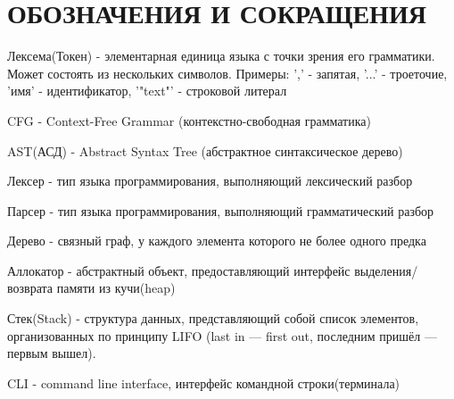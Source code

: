 
\chapter*{ОБОЗНАЧЕНИЯ И СОКРАЩЕНИЯ}             %

\newcommand{\acrstyle}[1]{#1}


\acrstyle{Лексема(Токен)} - элементарная единица языка с точки зрения его грамматики. Может состоять из нескольких символов.
Примеры: ',' - запятая, '...' - троеточие, 'имя' - идентификатор, '"text"' - строковой литерал

\acrstyle{CFG} - Context-Free Grammar (контекстно-свободная грамматика)

\acrstyle{AST(АСД)} - Abstract Syntax Tree (абстрактное синтаксическое дерево)

\acrstyle{Лексер} - тип языка программирования, выполняющий лексический разбор

\acrstyle{Парсер} - тип языка программирования, выполняющий грамматический разбор


\acrstyle{Дерево} - связный граф, у каждого элемента которого не более одного предка

\acrstyle{Аллокатор} - абстрактный объект, предоставляющий интерфейс выделения/возврата памяти из кучи(heap)

\acrstyle{Стек(Stack)} -  структура данных, представляющий собой список элементов, организованных по принципу LIFO (last in — first out, последним пришёл — первым вышел).

\acrstyle{CLI} -  command line interface, интерфейс командной строки(терминала)